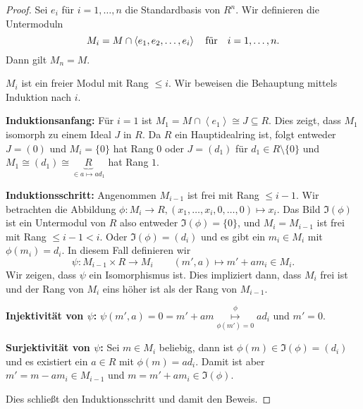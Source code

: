 \begin{proof}
	Sei $e_{i}$ für $i = 1,\ldots,n$ die Standardbasis von $R^{n}$.
	Wir definieren die Untermoduln
	\[
		M_{i} = M \cap \left< e_1,e_2,\ldots,e_{i} \right> \qq{für} i = 1,\ldots,n
	.\] 
	Dann gilt $M_{n} = M$.
	\begin{claim}
		$M_{i}$ ist ein freier Modul mit Rang $\leq i$.
		Wir beweisen die Behauptung mittels Induktion nach $i$.
		
		\textbf{Induktionsanfang:} Für $i = 1$ ist $M_1 = M \cap \left< e_1 \right> \cong J \subseteq R$.
		Dies zeigt, dass $M_1$ isomorph zu einem Ideal $J$ in $R$.
		Da $R$ ein Hauptidealring ist, folgt entweder $J = (0)$ und $M_{i} = \{0\} $ hat Rang $0$ oder
		$J = (d_1)$ für $d_1 \in R\setminus \{0\}$ und $M_1 \cong (d_1) \cong \underbrace{R}_{\in a \mapsto a d_1}$ hat Rang $1$.

		\textbf{Induktionsschritt:} Angenommen $M_{i-1}$ ist frei mit Rang $\leq i -1$.
		Wir betrachten die Abbildung $\phi: M_{i} \to R, (x_1,\ldots,x_{i},0,\ldots,0) \mapsto x_{i}$.
		Das Bild $\Im(\phi)$ ist ein Untermodul von $R$ also entweder $\Im(\phi) = \{0\}$, und $M_{i} = M_{i-1}$ ist frei mit Rang $\leq i-1 < i$.
		Oder $\Im(\phi) = (d_{i})$ und es gibt ein $m_{i} \in M_{i}$ mit $\phi(m_{i}) = d_{i}$.
		In diesem Fall definieren wir
		\[
			\psi: M_{i-1} \times R \to M_{i} \qquad (m',a) \mapsto m' + a m_{i} \in M_{i}
		.\] 
		Wir zeigen, dass $\psi$ ein Isomorphismus ist.
		Dies impliziert dann, dass $M_{i}$ frei ist und der Rang von $M_{i}$ eins höher ist als der Rang von $M_{i-1}$.

		\textbf{Injektivität von $\psi$:} $\psi(m',a) = 0 = m' + a m \overset{\phi}{\underset{\phi(m') = 0}{\mapsto }} a d_{i}$ und $m' = 0$.

		\textbf{Surjektivität von $\psi$:} Sei $m \in M_{i}$ beliebig, dann ist $\phi(m) \in \Im(\phi) = (d_{i})$ und es existiert
		ein $a \in R$ mit $\phi(m) = a d_{i}$. Damit ist aber $m' = m - a m_{i} \in M_{i-1}$
		und $m = m' + a m_{i} \in \Im(\phi)$.
	\end{claim}
	Dies schließt den Induktionsschritt und damit den Beweis.
\end{proof}

